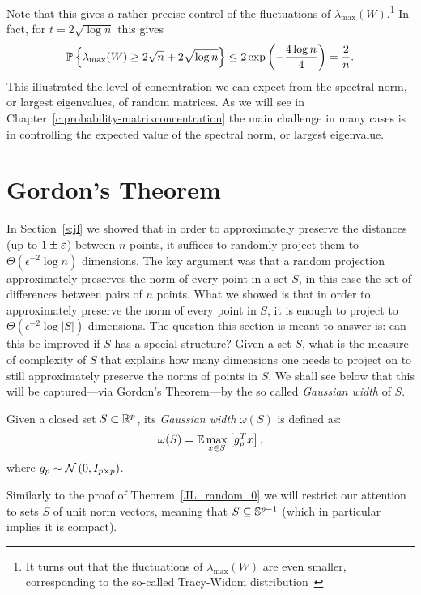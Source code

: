 Note that this gives a rather precise control of the fluctuations of $\lambda_{\max}(W)$.\footnote{It turns out that the fluctuations of $\lambda_{\max}(W)$ are even smaller, corresponding to the so-called Tracy-Widom distribution~\cite{Anderson_Guionnet_Zeitouni_IntroRandomMatrices}}
In fact, for $t = 2\sqrt{\log n}$ this gives
\[
{\mathbb{P}}\left\{ \lambda_{\max}(W) \geq 2\sqrt{n} + 2\sqrt{\log n}  \right\} \leq 2\exp\left( -\frac{4\log n}{4} \right) = \frac2n.
\]
This illustrated the level of concentration we can expect from the spectral norm, or largest eigenvalues, of random matrices. As we will see in Chapter~\ref{c:probability-matrixconcentration} the main challenge in many cases is in controlling the expected value of the spectral norm, or largest eigenvalue.



\section{Gordon's Theorem}\label{s:gordon}

In Section~\ref{s:jl} we showed that in order to approximately preserve the distances (up to $1\pm \varepsilon$) between $n$ points, it suffices to randomly project them to $\Theta\left(\epsilon^{-2} \log n \right)$ dimensions. The key argument was that a random projection approximately preserves the norm of every point in a set $S$, in this case the set of differences between pairs of $n$ points. What we showed is that in order to approximately preserve the norm of every point in $S$, it is enough to project to $\Theta\left(\epsilon^{-2} \log |S| \right)$ dimensions. The question this section is meant to answer is: can this be improved if $S$ has a special structure? Given a set $S$, what is the measure of complexity of $S$ that explains how many dimensions one needs to project on to still approximately preserve the norms of points in $S$. We shall see below that this will be captured---via Gordon's Theorem---by the so called {\em Gaussian width} of $S$.

\begin{definition}\label{def:gaussianwidth}
Given a closed set $S\subset \mathbb{R}^{p}$, its \emph{Gaussian width} $\omega(S)$ is defined as:
\[
\omega(S) = \mathbb{E} \max_{x\in S} \left[ g_p^Tx  \right],
\]
where $g_p\sim \mathcal{N}\left(0,I_{p\times p}\right)$.  
\end{definition}

Similarly to the proof of Theorem~\ref{JL_random_0} we will restrict our attention to sets $S$ of unit norm vectors, meaning that $S\subseteq \mathbb{S}^{p-1}$ (which in particular implies it is compact).

